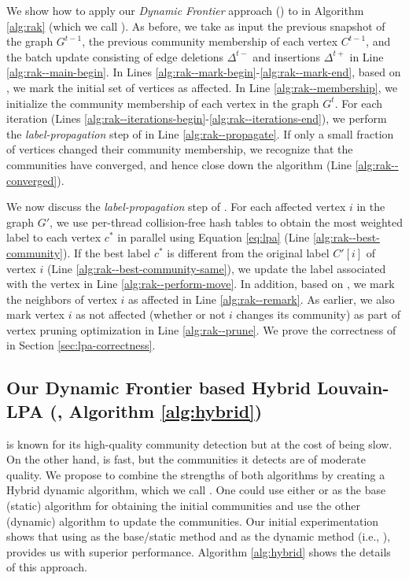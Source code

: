 We show how to apply our \textit{Dynamic Frontier} approach (\Fro{}) to \LPA{} in Algorithm \ref{alg:rak} (which we call \FroLPA{}). As before, we take as input the previous snapshot of the graph $G^{t-1}$, the previous community membership of each vertex $C^{t-1}$, and the batch update consisting of edge deletions $\Delta^{t-}$ and insertions $\Delta^{t+}$ in Line \ref{alg:rak--main-begin}. In Lines \ref{alg:rak--mark-begin}-\ref{alg:rak--mark-end}, based on \Fro{}, we mark the initial set of vertices as affected. In Line \ref{alg:rak--membership}, we initialize the community membership of each vertex in the graph $G^t$. For each iteration (Lines \ref{alg:rak--iterations-begin}-\ref{alg:rak--iterations-end}), we perform the \textit{label-propagation} step of \LPA{} in Line \ref{alg:rak--propagate}. If only a small fraction of vertices changed their community membership, we recognize that the communities have converged, and hence close down the algorithm (Line \ref{alg:rak--converged}).

We now discuss the \textit{label-propagation} step of \LPA{}. For each affected vertex $i$ in the graph $G'$, we use per-thread collision-free hash tables to obtain the most weighted label to each vertex $c^*$ in parallel using Equation \ref{eq:lpa} (Line \ref{alg:rak--best-community}). If the best label $c^*$ is different from the original label $C'[i]$ of vertex $i$ (Line \ref{alg:rak--best-community-same}), we update the label associated with the vertex in Line \ref{alg:rak--perform-move}. In addition, based on \Fro{}, we mark the neighbors of vertex $i$ as affected in Line \ref{alg:rak--remark}. As earlier, we also mark vertex $i$ as not affected (whether or not $i$ changes its community) as part of vertex pruning optimization in Line \ref{alg:rak--prune}. We prove the correctness of \FroLPA{} in Section \ref{sec:lpa-correctness}.




\subsection{Our Dynamic Frontier based Hybrid Louvain-LPA (\FroHyb{}, Algorithm \ref{alg:hybrid})}
\label{sec:dynamic-hybrid}

\Lou{} is known for its high-quality community detection but at the cost of being slow. On the other hand, \LPA{} is fast, but the communities it detects are of moderate quality. We propose to combine the strengths of both algorithms by creating a Hybrid dynamic algorithm, which we call \FroHyb{}. One could use either \Lou{} or \LPA{} as the base (static) algorithm for obtaining the initial communities and use the other (dynamic) algorithm to update the communities. Our initial experimentation shows that using \Lou{} as the base/static method and \LPA{} as the dynamic method (i.e., \FroHyb{}), provides us with superior performance. Algorithm \ref{alg:hybrid} shows the details of this approach.




